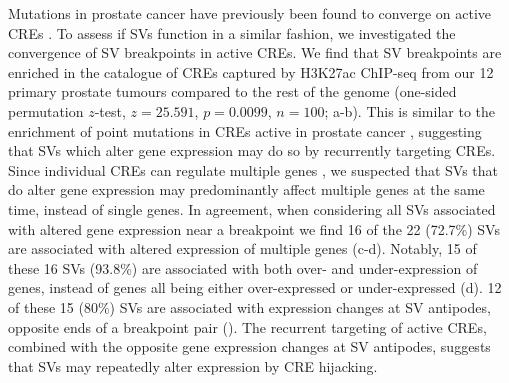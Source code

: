 Mutations in prostate cancer have previously been found to converge on active CREs \cite{mazrooeiCistromePartitioningReveals2019}.
To assess if SVs function in a similar fashion, we investigated the convergence of SV breakpoints in active CREs.
We find that SV breakpoints are enriched in the catalogue of CREs captured by H3K27ac ChIP-seq from our 12 primary prostate tumours compared to the rest of the genome (one-sided permutation $z$-test, $z = 25.591$, $p = 0.0099$, $n = 100$; a-b).
This is similar to the enrichment of point mutations in CREs active in prostate cancer \cite{mazrooeiCistromePartitioningReveals2019}, suggesting that SVs which alter gene expression may do so by recurrently targeting CREs.
Since individual CREs can regulate multiple genes \cite{gasperiniGenomewideFrameworkMapping2019}, we suspected that SVs that do alter gene expression may predominantly affect multiple genes at the same time, instead of single genes.
In agreement, when considering all SVs associated with altered gene expression near a breakpoint we find 16 of the 22 (72.7\%) SVs are associated with altered expression of multiple genes (c-d).
Notably, 15 of these 16 SVs (93.8\%) are associated with both over- and under-expression of genes, instead of genes all being either over-expressed or under-expressed (d).
12 of these 15 (80\%) SVs are associated with expression changes at SV antipodes, opposite ends of a breakpoint pair ().
The recurrent targeting of active CREs, combined with the opposite gene expression changes at SV antipodes, suggests that SVs may repeatedly alter expression by CRE hijacking.


